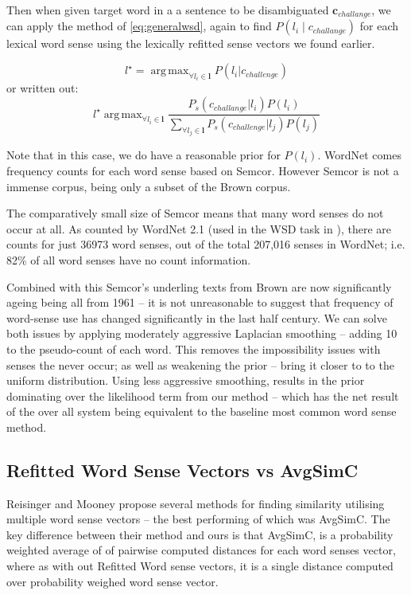 \documentclass{sig-alternate}
\renewcommand{\c}{\mathbf{c}}
\renewcommand{\l}{\mathbf{l}}
\DeclareMathOperator*{\argmax}{arg\,max}
\begin{document}
Then when given target word in a a sentence to be disambiguated $\c_{challange}$, we can apply the method of \cref{eq:generalwsd}, again to find $P(l_i \mid c_{challange})$ for each lexical word sense using the lexically refitted sense vectors we found earlier.

\begin{equation}\label{eq:lexicalwsd}
l^\star = \argmax_{\forall l_i \in \l} P(l_i|c_{challenge})
\end{equation}
or written out:
\begin{equation}\label{eq:lexicalwsdexpanded}
l^\star \argmax_{\forall l_i \in \l} \frac{P_s(c_{challange}|l_i)P(l_i)}{\sum_{\forall l_j \in \l} P_s(c_{challenge}|l_j)P(l_j)}
\end{equation}

Note that in this case, we do have a reasonable prior for $P(l_i)$.
WordNet comes frequency counts for each word sense based on Semcor\cite{tengi1998design}.
However Semcor is not a immense corpus, being only a subset of the Brown corpus.

The comparatively small size of Semcor means that many word senses do not occur at all. As counted by WordNet 2.1 (used in the WSD task in ), there are counts for just  36973 word senses, out of the total 207,016 senses in WordNet; i.e. 82\% of all word senses have no count information. 

Combined with this Semcor's underling texts from Brown are now significantly ageing being all from 1961 -- it is not unreasonable to suggest that frequency of word-sense use has changed significantly in the last half century.
We can solve both issues by applying moderately aggressive Laplacian smoothing -- adding 10 to the pseudo-count of each word. This removes the impossibility issues with senses the never occur; as well as weakening the prior -- bring it closer to to the uniform distribution. 
Using less aggressive smoothing, results in the prior dominating over the likelihood term from our method -- which has the net result of the over all system being equivalent to the baseline most common word sense method.



\subsection{Refitted Word Sense Vectors vs AvgSimC}\label{RefittedSimVsAvgSimC}
Reisinger and Mooney \cite{Reisinger2010} propose several methods for finding similarity utilising multiple word sense vectors -- the best performing of which was AvgSimC.
The key difference between their method and ours is that AvgSimC, is a probability weighted average of of pairwise computed distances for each word senses vector,
where as with out Refitted Word sense vectors, it is a single distance computed over probability weighed word sense vector.
\end{document}
